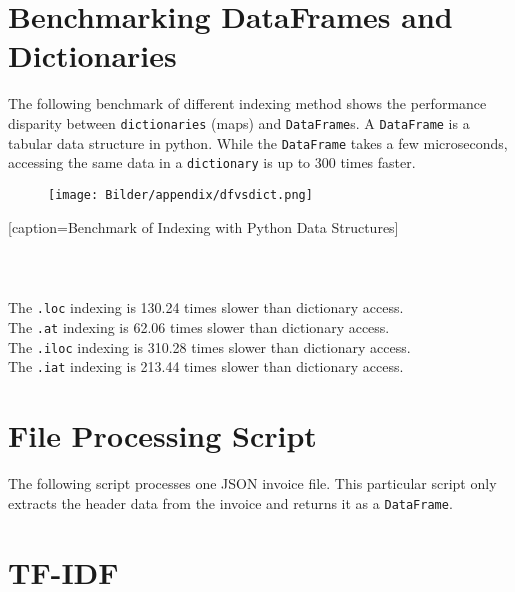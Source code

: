 \section{Benchmarking DataFrames and Dictionaries}
\label{benchmarkDF}

The following benchmark of different indexing method shows the performance disparity between \lstinline|dictionaries| (maps) and \lstinline|DataFrame|s. A \lstinline|DataFrame| is a tabular data structure in python. While the \lstinline|DataFrame| takes a few microseconds, accessing the same data in a \lstinline|dictionary| is up to 300 times faster.
\begin{figure}[h!]
	\texttt{[image: Bilder/appendix/dfvsdict.png]}
	\label{fig:dbscan-plot}
\end{figure}
 [caption={Benchmark of Indexing with Python Data Structures}]
\begin{lstlisting}

	   
\end{lstlisting}
The \lstinline|.loc| indexing is  130.24 times slower than dictionary access.\\
The \lstinline|.at|  indexing is  62.06 times slower than dictionary access.\\
The \lstinline|.iloc|  indexing is  310.28 times slower than dictionary access.\\
The \lstinline|.iat|  indexing is  213.44 times slower than dictionary access.

\newpage
\section{File Processing Script}
The following script processes one \ac{JSON} invoice file. This particular script only extracts the header data from the invoice and returns it as a \lstinline|DataFrame|.



\newpage

\section{\ac{TF-IDF}}
\label{appendix:tfidf}

